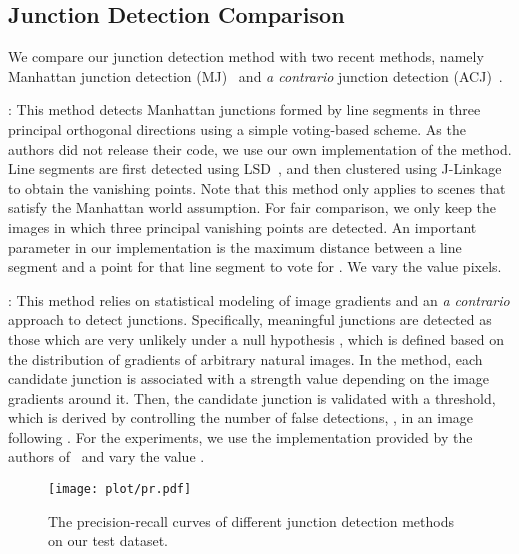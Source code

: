 \documentclass[10pt,twocolumn,letterpaper]{article}
\begin{document}
\subsection{Junction Detection Comparison}
\label{sec:exp:junction}
We compare our junction detection method with two recent methods, namely Manhattan junction detection (MJ)~\cite{RamalingamPJT13} and \emph{a contrario} junction detection (ACJ)~\cite{XiaDG14}.

: This method detects Manhattan junctions formed by line segments in three principal orthogonal directions using a simple voting-based scheme. As the authors did not release their code, we use our own implementation of the method. Line segments are first detected using LSD~\cite{von2012lsd}, and then clustered using J-Linkage~\cite{Tardif09} to obtain the vanishing points. Note that this method only applies to scenes that satisfy the Manhattan world assumption. For fair comparison, we only keep the images in which three principal vanishing points are detected. An important parameter in our implementation is the maximum distance  between a line segment and a point  for that line segment to vote for . We vary the value  pixels.

: This method relies on statistical modeling of image gradients and an \emph{a contrario} approach to detect junctions. Specifically, meaningful junctions are detected as those which are very unlikely under a null hypothesis , which is defined based on the distribution of gradients of arbitrary natural images. In the method, each candidate junction is associated with a strength value depending on the image gradients around it. Then, the candidate junction is validated with a threshold, which is derived by controlling the number of false detections, , in an image following . For the experiments, we use the implementation provided by the authors of~\cite{XiaDG14} and vary the value .

\begin{figure}[t]
    \centering
    \texttt{[image: plot/pr.pdf]}
    \caption{The precision-recall curves of different junction detection methods on our test dataset.}\vspace{-3mm}
    \label{fig:pr}
\end{figure}
\end{document}
